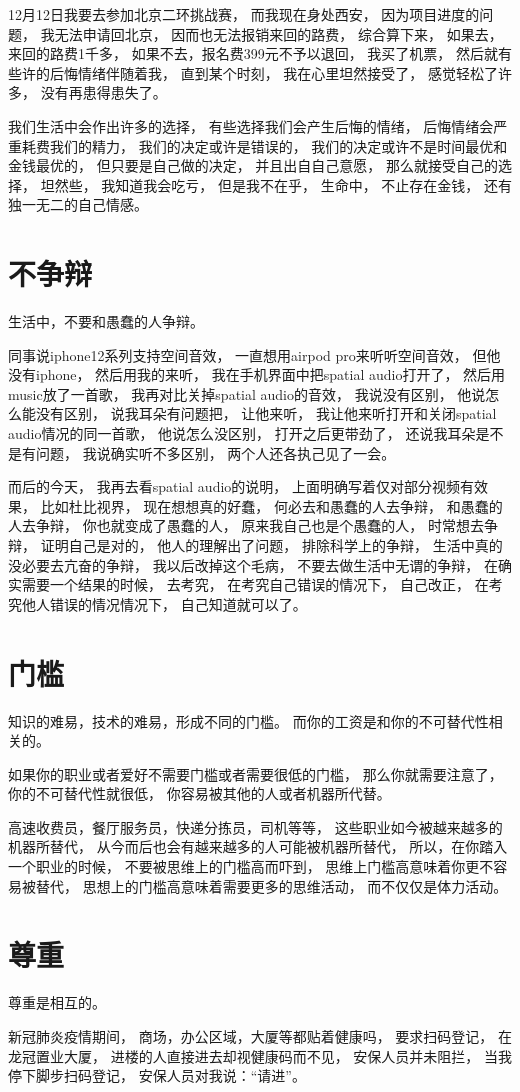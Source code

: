 12月12日我要去参加北京二环挑战赛，
而我现在身处西安，
因为项目进度的问题，
我无法申请回北京，
因而也无法报销来回的路费，
综合算下来，
如果去，来回的路费1千多，
如果不去，报名费399元不予以退回，
我买了机票，
然后就有些许的后悔情绪伴随着我，
直到某个时刻，
我在心里坦然接受了，
感觉轻松了许多，
没有再患得患失了。



我们生活中会作出许多的选择，
有些选择我们会产生后悔的情绪，
后悔情绪会严重耗费我们的精力，
我们的决定或许是错误的，
我们的决定或许不是时间最优和金钱最优的，
但只要是自己做的决定，
并且出自自己意愿，
那么就接受自己的选择，
坦然些，
我知道我会吃亏，
但是我不在乎，
生命中，
不止存在金钱，
还有独一无二的自己情感。







\section{不争辩}


生活中，不要和愚蠢的人争辩。


同事说iphone12系列支持空间音效，
一直想用airpod pro来听听空间音效，
但他没有iphone，
然后用我的来听，
我在手机界面中把spatial audio打开了，
然后用music放了一首歌，
我再对比关掉spatial audio的音效，
我说没有区别，
他说怎么能没有区别，
说我耳朵有问题把，
让他来听，
我让他来听打开和关闭spatial audio情况的同一首歌，
他说怎么没区别，
打开之后更带劲了，
还说我耳朵是不是有问题，
我说确实听不多区别，
两个人还各执己见了一会。

而后的今天，
我再去看spatial audio的说明，
上面明确写着仅对部分视频有效果，
比如杜比视界，
现在想想真的好蠢，
何必去和愚蠢的人去争辩，
和愚蠢的人去争辩，
你也就变成了愚蠢的人，
原来我自己也是个愚蠢的人，
时常想去争辩，
证明自己是对的，
他人的理解出了问题，
排除科学上的争辩，
生活中真的没必要去亢奋的争辩，
我以后改掉这个毛病，
不要去做生活中无谓的争辩，
在确实需要一个结果的时候，
去考究，
在考究自己错误的情况下，
自己改正，
在考究他人错误的情况情况下，
自己知道就可以了。



\section{门槛}


知识的难易，技术的难易，形成不同的门槛。
而你的工资是和你的不可替代性相关的。


如果你的职业或者爱好不需要门槛或者需要很低的门槛，
那么你就需要注意了，
你的不可替代性就很低，
你容易被其他的人或者机器所代替。

高速收费员，餐厅服务员，快递分拣员，司机等等，
这些职业如今被越来越多的机器所替代，
从今而后也会有越来越多的人可能被机器所替代，
所以，在你踏入一个职业的时候，
不要被思维上的门槛高而吓到，
思维上门槛高意味着你更不容易被替代，
思想上的门槛高意味着需要更多的思维活动，
而不仅仅是体力活动。


\section{尊重}

尊重是相互的。

新冠肺炎疫情期间，
商场，办公区域，大厦等都贴着健康吗，
要求扫码登记，
在龙冠置业大厦，
进楼的人直接进去却视健康码而不见，
安保人员并未阻拦，
当我停下脚步扫码登记，
安保人员对我说：“请进”。










